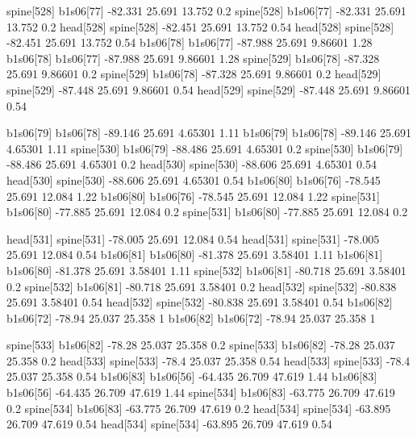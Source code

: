 spine[528]    b1s06[77]    -82.331    25.691    13.752    0.2
spine[528]    b1s06[77]    -82.331    25.691    13.752    0.2
head[528]    spine[528]    -82.451    25.691    13.752    0.54
head[528]    spine[528]    -82.451    25.691    13.752    0.54
b1s06[78]    b1s06[77]    -87.988    25.691    9.86601    1.28
b1s06[78]    b1s06[77]    -87.988    25.691    9.86601    1.28
spine[529]    b1s06[78]    -87.328    25.691    9.86601    0.2
spine[529]    b1s06[78]    -87.328    25.691    9.86601    0.2
head[529]    spine[529]    -87.448    25.691    9.86601    0.54
head[529]    spine[529]    -87.448    25.691    9.86601    0.54


b1s06[79]    b1s06[78]    -89.146    25.691    4.65301    1.11
b1s06[79]    b1s06[78]    -89.146    25.691    4.65301    1.11
spine[530]    b1s06[79]    -88.486    25.691    4.65301    0.2
spine[530]    b1s06[79]    -88.486    25.691    4.65301    0.2
head[530]    spine[530]    -88.606    25.691    4.65301    0.54
head[530]    spine[530]    -88.606    25.691    4.65301    0.54
b1s06[80]    b1s06[76]    -78.545    25.691    12.084    1.22
b1s06[80]    b1s06[76]    -78.545    25.691    12.084    1.22
spine[531]    b1s06[80]    -77.885    25.691    12.084    0.2
spine[531]    b1s06[80]    -77.885    25.691    12.084    0.2


head[531]    spine[531]    -78.005    25.691    12.084    0.54
head[531]    spine[531]    -78.005    25.691    12.084    0.54
b1s06[81]    b1s06[80]    -81.378    25.691    3.58401    1.11
b1s06[81]    b1s06[80]    -81.378    25.691    3.58401    1.11
spine[532]    b1s06[81]    -80.718    25.691    3.58401    0.2
spine[532]    b1s06[81]    -80.718    25.691    3.58401    0.2
head[532]    spine[532]    -80.838    25.691    3.58401    0.54
head[532]    spine[532]    -80.838    25.691    3.58401    0.54
b1s06[82]    b1s06[72]    -78.94    25.037    25.358    1
b1s06[82]    b1s06[72]    -78.94    25.037    25.358    1


spine[533]    b1s06[82]    -78.28    25.037    25.358    0.2
spine[533]    b1s06[82]    -78.28    25.037    25.358    0.2
head[533]    spine[533]    -78.4    25.037    25.358    0.54
head[533]    spine[533]    -78.4    25.037    25.358    0.54
b1s06[83]    b1s06[56]    -64.435    26.709    47.619    1.44
b1s06[83]    b1s06[56]    -64.435    26.709    47.619    1.44
spine[534]    b1s06[83]    -63.775    26.709    47.619    0.2
spine[534]    b1s06[83]    -63.775    26.709    47.619    0.2
head[534]    spine[534]    -63.895    26.709    47.619    0.54
head[534]    spine[534]    -63.895    26.709    47.619    0.54


